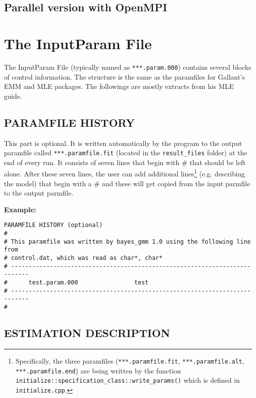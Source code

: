 \documentclass[11pt, letterpaper, notitlepage]{article}
\begin{document}
\subsection{Parallel version with OpenMPI}

\pagebreak 

\section{The InputParam File}

The InputParam File (typically named as \texttt{***.param.000}) contains several blocks of control information. The structure is the same as the paramfiles for Gallant's EMM and MLE packages. The followings are mostly extracts from his MLE guide.

\subsection{PARAMFILE HISTORY}

This part is optional. It is written automatically by the program to the output paramfile called \texttt{***.paramfile.fit} (located in the \texttt{result\_files} folder) at the end of every run. It consists of seven lines that begin with \# that should be left alone. After these seven lines, the user can add additional lines\footnote{Specifically, the three paramfiles (\texttt{***.paramfile.fit}, \texttt{***.paramfile.alt}, \texttt{***.paramfile.end}) are being written by the function \texttt{initialize::specification\_class::write\_params()} which is defined in \texttt{initialize.cpp}.} (e.g. describing the model) that begin with a \# and these will get copied from the input parmfile to the output parmfile.  

\textbf{Example:}

\begin{verbatim}
PARAMFILE HISTORY (optional)
#
# This paramfile was written by bayes_gmm 1.0 using the following line from
# control.dat, which was read as char*, char*
# ---------------------------------------------------------------------------
#      test.param.000                test
# ---------------------------------------------------------------------------
#
\end{verbatim}

\subsection{ESTIMATION DESCRIPTION}
\end{document}

